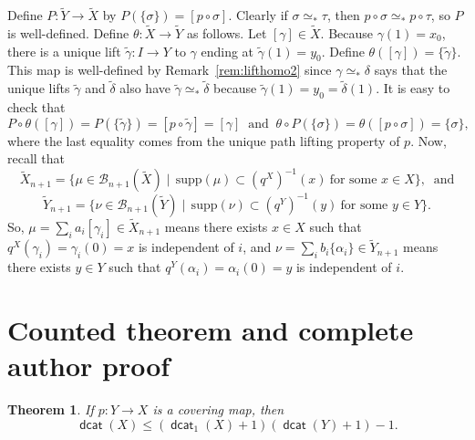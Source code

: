 \documentclass[10pt,a4paper]{amsart}
\let\scr\mathscr %
\newtheorem{theorem}{Theorem}
\theoremstyle{definition}
\DeclareMathOperator{\dcat}{{\mathsf{dcat}}}
\def\B{{\scr B}}
\begin{document}
Define $P\colon \widetilde Y \to \widetilde X$ by $P(\{\sigma\}) = [p\circ\sigma]$. Clearly if
$\sigma\simeq_*\tau$, then $p\circ\sigma\simeq_* p\circ\tau$, so $P$ is well-defined.
Define $\theta\colon \widetilde X \to \widetilde Y$ as follows. Let $[\gamma]\in \widetilde X$. Because $\gamma(1)=x_0$, there is a unique lift $\widetilde\gamma\colon I \to Y$ to $\gamma$ ending at
$\widetilde\gamma(1)=y_0$. Define $\theta([\gamma])=\{\widetilde\gamma\}$. This map is well-defined
by Remark~\ref{rem:lifthomo2} since $\gamma \simeq_* \delta$ says that the unique 
lifts $\widetilde\gamma$
and $\widetilde \delta$ also have $\widetilde\gamma \simeq_* \widetilde\delta$ because $\widetilde\gamma(1) = y_0 =
\widetilde\delta(1)$. It is easy to check that
\[
P\circ\theta([\gamma])  = P(\{\widetilde\gamma\}) = [p\circ\widetilde\gamma]  = [\gamma] \ \text{ and } \
\theta\circ P(\{\sigma\}) = \theta([p\circ\sigma]) = \{\sigma\},
\]
where the last equality comes from the unique path lifting property of $p$. Now, recall that 
\[
\widetilde X_{n+1} = \{\mu \in \B_{n+1}(\widetilde X) \mid\, \text{supp}(\mu) \subset (q^X)^{-1}(x)\
\text{for\ some\ } x\in X\}, \ \text{ and}
\]
\[
\widetilde Y_{n+1} = \{\nu \in \B_{n+1}(\widetilde Y) \mid\, \text{supp}(\nu) \subset (q^Y)^{-1}(y)\
\text{for\ some\ } y\in Y\}.
\]
So, $\mu = \sum_i a_i [\gamma_i] \in \widetilde{X}_{n+1}$ means there exists $x\in X$ such that $q^X(\gamma_i)=\gamma_i(0)=x$ is independent of $i$, and $\nu=\sum_i b_i \{\alpha_i\} \in \widetilde{Y}_{n+1}$ means there exists $y\in Y$ such that $q^Y(\alpha_i)=\alpha_i(0)=y$ is independent of $i$.

\section*{Counted theorem and complete author proof}
\begin{theorem}\label{thm:general ineq}
    If $p\colon Y\to X$ is a covering map, then
    \[
    \dcat(X)\le (\dcat_1(X)+1)(\dcat(Y)+1)-1.
    \]
\end{theorem}
\end{document}
